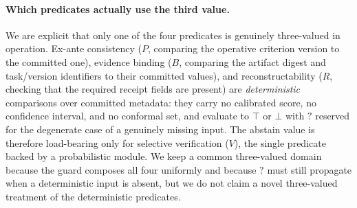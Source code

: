 \documentclass[sigconf,anonymous,review]{acmart}
\begin{document}
\paragraph{Which predicates actually use the third value.} We are explicit that only one of the four predicates is genuinely three-valued in operation. Ex-ante consistency ($P$, comparing the operative criterion version to the committed one), evidence binding ($B$, comparing the artifact digest and task/version identifiers to their committed values), and reconstructability ($R$, checking that the required receipt fields are present) are \emph{deterministic} comparisons over committed metadata: they carry no calibrated score, no confidence interval, and no conformal set, and evaluate to $\top$ or $\bot$ with $?$ reserved for the degenerate case of a genuinely missing input. The abstain value is therefore load-bearing only for selective verification ($V$), the single predicate backed by a probabilistic module. We keep a common three-valued domain because the guard composes all four uniformly and because $?$ must still propagate when a deterministic input is absent, but we do not claim a novel three-valued treatment of the deterministic predicates.
\end{document}
